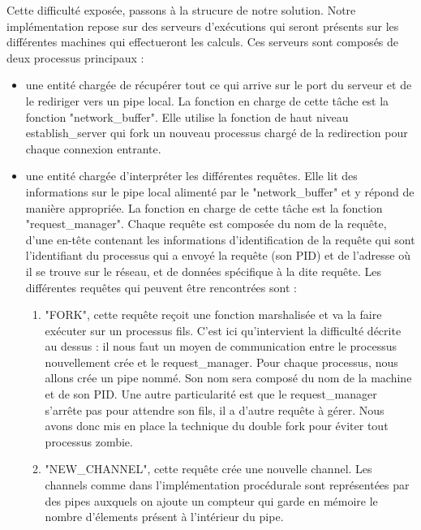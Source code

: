 \documentclass[a4paper, 12pt, twoside]{report}
\begin{document}
Cette difficulté exposée, passons à la strucure de notre solution. Notre implémentation repose sur des serveurs d'exécutions 
qui seront présents sur les différentes machines qui effectueront les calculs. Ces serveurs sont composés de deux processus 
principaux :\\
\begin{itemize}
  \item une entité chargée de récupérer tout ce qui arrive sur le port du serveur et de le rediriger vers un pipe local.
        La fonction en charge de cette tâche est la fonction "network\_buffer". Elle utilise la fonction de haut niveau 
        establish\_server qui fork un nouveau processus chargé de la redirection pour chaque connexion entrante. 
  \item une entité chargée d'interpréter les différentes requêtes. Elle lit des informations sur le pipe local alimenté par le 
        "network\_buffer" et y répond de manière appropriée. La fonction en charge de cette tâche est la fonction "request\_manager".
        Chaque requête est composée du nom de la requête, d'une 
        en-tête contenant les informations d'identification de la requête qui sont l'identifiant du processus qui a 
        envoyé la requête (son PID) et de l'adresse où il se trouve sur le réseau, et de données spécifique à la dite 
        requête. Les différentes requêtes qui peuvent être rencontrées sont :\\
        \begin{enumerate}
          \item "FORK", cette requête reçoit une fonction marshalisée et va la faire exécuter sur un processus fils. C'est ici 
                qu'intervient la difficulté décrite au dessus : il nous faut un moyen de communication entre le processus 
                nouvellement crée et le request\_manager. Pour chaque processus, nous allons crée un pipe nommé. Son nom sera 
                composé du nom de la machine et de son PID. Une autre particularité est que le request\_manager s'arrête pas 
                pour attendre son fils, il a d'autre requête à gérer. Nous avons donc mis en place la technique du double 
                fork pour éviter tout processus zombie.
          \item "NEW\_CHANNEL", cette requête crée une nouvelle channel. Les channels comme dans l'implémentation procédurale
                sont représentées par des pipes auxquels on ajoute un compteur qui garde en mémoire le nombre d'élements 
                présent à l'intérieur du pipe.

\end{enumerate}
\end{itemize}
\end{document}
